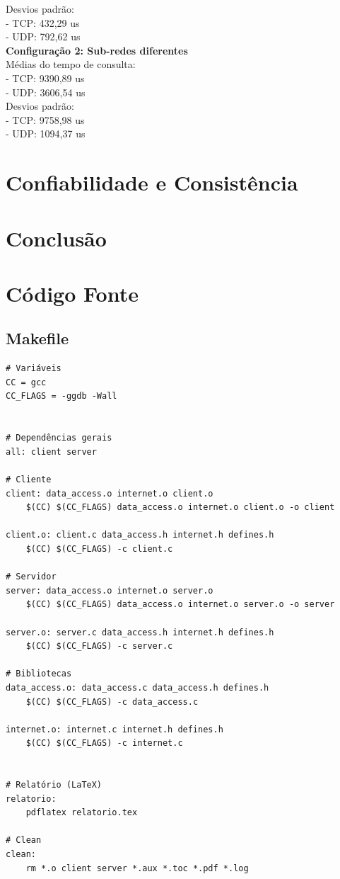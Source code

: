\documentclass[11pt,twoside]{article}
\begin{document}
Desvios padrão:\\
- TCP: 432,29 us\\
- UDP: 792,62 us\\

\textbf{Configuração 2: Sub-redes diferentes}\\
Médias do tempo de consulta:\\
- TCP: 9390,89 us\\
- UDP: 3606,54 us\\

Desvios padrão:\\
- TCP: 9758,98 us\\
- UDP: 1094,37 us\\


\section{Confiabilidade e Consistência}


\section{Conclusão}

\section{Código Fonte}
\subsection{Makefile}
\begin{verbatim}
# Variáveis
CC = gcc
CC_FLAGS = -ggdb -Wall


# Dependências gerais
all: client server

# Cliente
client: data_access.o internet.o client.o
	$(CC) $(CC_FLAGS) data_access.o internet.o client.o -o client

client.o: client.c data_access.h internet.h defines.h
	$(CC) $(CC_FLAGS) -c client.c

# Servidor
server: data_access.o internet.o server.o
	$(CC) $(CC_FLAGS) data_access.o internet.o server.o -o server

server.o: server.c data_access.h internet.h defines.h
	$(CC) $(CC_FLAGS) -c server.c

# Bibliotecas
data_access.o: data_access.c data_access.h defines.h
	$(CC) $(CC_FLAGS) -c data_access.c

internet.o: internet.c internet.h defines.h
	$(CC) $(CC_FLAGS) -c internet.c


# Relatório (LaTeX)
relatorio:
	pdflatex relatorio.tex

# Clean
clean:
	rm *.o client server *.aux *.toc *.pdf *.log
\end{verbatim}
\end{document}
